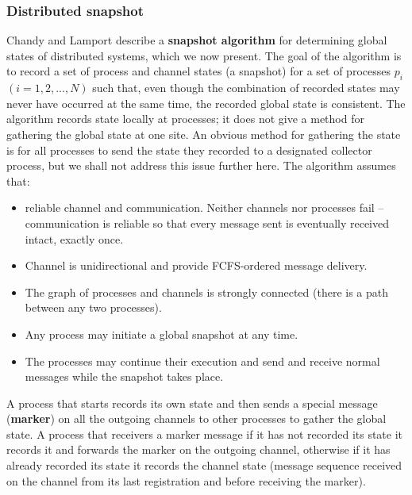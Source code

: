 \documentclass[11pt,a4paper]{article}
\begin{document}
\subsubsection{Distributed snapshot}
Chandy and Lamport describe a \textbf{snapshot algorithm} for determining global states of distributed systems, which we now present. The goal of the algorithm is to record a set of process and channel states (a snapshot) for a set of processes $p_i$ $(i=1,2,...,N)$ such that, even though the combination of recorded states may never have occurred at the same time, the recorded global state is consistent.
The algorithm records state locally at processes; it does not give a method for gathering the global state at one site. An obvious method for gathering the state is for all processes to send the state they recorded to a designated collector process, but we shall not address this issue further here. The algorithm assumes that:
\begin{itemize}
	\item reliable channel and communication. Neither channels nor processes fail – communication is reliable so that every message sent is eventually received intact, exactly once.
	\item Channel is unidirectional and provide FCFS-ordered message delivery.
	\item The graph of processes and channels is strongly connected (there is a path between
	any two processes).
	\item Any process may initiate a global snapshot at any time.
	\item The processes may continue their execution and send and receive normal
	messages while the snapshot takes place.
\end{itemize}
A process that starts records its own state and then sends a special message (\textbf{marker}) on all the outgoing channels to other processes to gather the global state. A process that receivers a marker message if it has not recorded its state it records it and forwards the marker on the outgoing channel, otherwise if it has already recorded its state it records the channel state (message sequence received on the channel from its last registration and before receiving the marker).


\newpage












\end{document}

